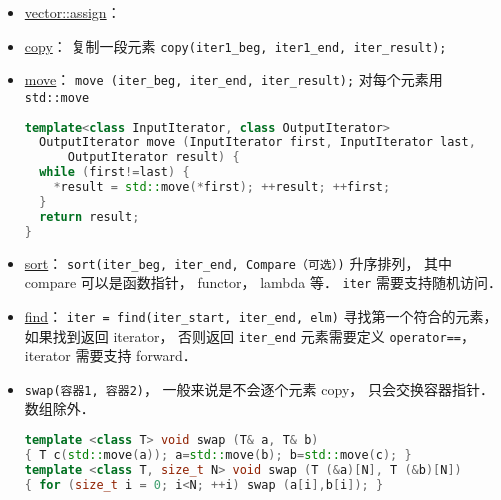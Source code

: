
\begin{issues}
\issueDraft
\end{issues}

\begin{itemize}
\item \href{https://en.cppreference.com/w/cpp/container/vector/assign}{vector::assign}： 
\item \href{https://cplusplus.com/reference/algorithm/copy/}{copy}： 复制一段元素 \verb|copy(iter1_beg, iter1_end, iter_result);|
\item \href{https://cplusplus.com/reference/algorithm/move/}{move}： \verb|move (iter_beg, iter_end, iter_result);| 对每个元素用 \verb|std::move|
\begin{lstlisting}[language=cpp]
template<class InputIterator, class OutputIterator>
  OutputIterator move (InputIterator first, InputIterator last,
      OutputIterator result) {
  while (first!=last) {
    *result = std::move(*first); ++result; ++first;
  }
  return result;
}
\end{lstlisting}
\item \href{https://cplusplus.com/reference/algorithm/sort/}{sort}： \verb|sort(iter_beg, iter_end, Compare（可选）)| 升序排列， 其中 compare 可以是函数指针， functor， lambda 等． \verb|iter| 需要支持随机访问．
\item \href{https://cplusplus.com/reference/algorithm/find/}{find}： \verb|iter = find(iter_start, iter_end, elm)| 寻找第一个符合的元素， 如果找到返回 iterator， 否则返回 \verb|iter_end| 元素需要定义 \verb|operator==|， iterator 需要支持 forward．
\item \verb|swap(容器1, 容器2)|， 一般来说是不会逐个元素 copy， 只会交换容器指针． 数组除外．
\begin{lstlisting}[language=cpp]
template <class T> void swap (T& a, T& b)
{ T c(std::move(a)); a=std::move(b); b=std::move(c); }
template <class T, size_t N> void swap (T (&a)[N], T (&b)[N])
{ for (size_t i = 0; i<N; ++i) swap (a[i],b[i]); }
\end{lstlisting}
\end{itemize}
